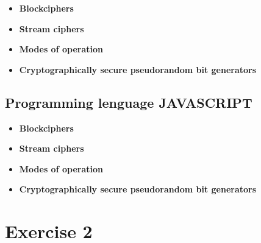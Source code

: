 \documentclass[12pt]{article}
\begin{document}
	        \begin{itemize}
	            \item[\checkmark] \textbf{Blockciphers}     \\
	                
	            \item[\checkmark] \textbf{Stream ciphers}   \\

	            \item[\checkmark] \textbf{Modes of operation}   \\
                
                \item[\checkmark] \textbf{Cryptographically secure pseudorandom bit generators}   \\

	        \end{itemize}
	    \subsection{Programming lenguage JAVASCRIPT}
	        \begin{itemize}
	            \item[\checkmark] \textbf{Blockciphers}     \\
	                
	            \item[\checkmark] \textbf{Stream ciphers}   \\

	            \item[\checkmark] \textbf{Modes of operation}   \\
                
                \item[\checkmark] \textbf{Cryptographically secure pseudorandom bit generators}   \\

	        \end{itemize}
	    
	\section{Exercise 2}
	
	
	
	
        	
 
\end{document}

